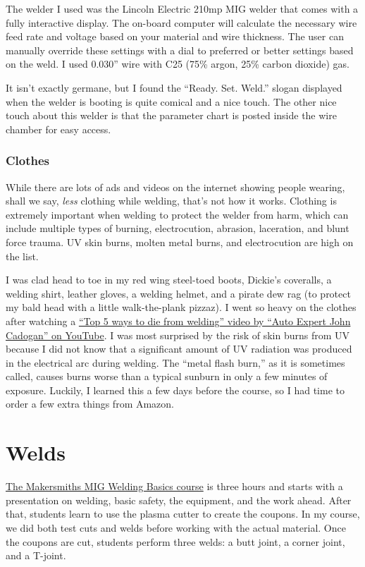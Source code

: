 \documentclass{article}
\begin{document}
The welder I used was the Lincoln Electric 210mp MIG welder that comes with a fully interactive display. The on-board computer will calculate the necessary wire feed rate and voltage based on your material and wire thickness. The user can manually override these settings with a dial to preferred or better settings based on the weld. I used 0.030'' wire with C25 (75\% argon, 25\% carbon dioxide) gas.

It isn't exactly germane, but I found the ``Ready. Set. Weld.'' slogan displayed when the welder is booting is quite comical and a nice touch. The other nice touch about this welder is that the parameter chart is posted inside the wire chamber for easy access.

\subsubsection*{Clothes}

While there are lots of ads and videos on the internet showing people wearing, shall we say, \textit{less} clothing while welding, that's not how it works. Clothing is extremely important when welding to protect the welder from harm, which can include multiple types of burning, electrocution, abrasion, laceration, and blunt force trauma. UV skin burns, molten metal burns, and electrocution are high on the list. 

I was clad head to toe in my red wing steel-toed boots, Dickie's coveralls, a welding shirt, leather gloves, a welding helmet, and a pirate dew rag (to protect my bald head with a little walk-the-plank pizzaz). I went so heavy on the clothes after watching a \href{https://www.youtube.com/watch?v=2hAJJky4KAQ}{``Top 5 ways to die from welding'' video by ``Auto Expert John Cadogan'' on YouTube}. I was most surprised by the risk of skin burns from UV because I did not know that a significant amount of UV radiation was produced in the electrical arc during welding. The ``metal flash burn,'' as it is sometimes called, causes burns worse than a typical sunburn in only a few minutes of exposure. Luckily, I learned this a few days before the course, so I had time to order a few extra things from Amazon.

\section*{Welds}

\href{https://docs.google.com/document/d/1sYnxE0w3G5uM2nR5jFW012oVzhfzPJhmpwZoW4EnWKo/edit#heading=h.kmv1drr7rapm}{The Makersmiths MIG Welding Basics course} is three hours and starts with a presentation on welding, basic safety, the equipment, and the work ahead. After that, students learn to use the plasma cutter to create the coupons. In my course, we did both test cuts and welds before working with the actual material. Once the coupons are cut, students perform three welds: a butt joint, a corner joint, and a T-joint.
\end{document}
